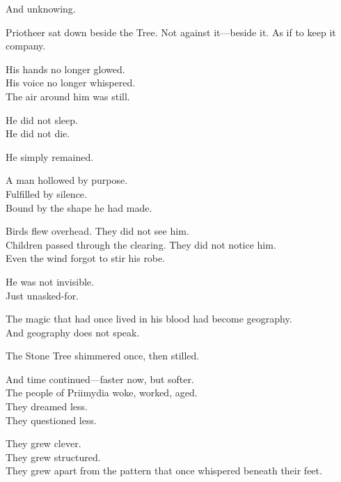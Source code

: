 \documentclass[12pt]{article}
\begin{document}
\vspace{0.5em}
And unknowing.

\vspace{0.5em}
Priotheer sat down beside the Tree. Not against it---beside it. As if to keep it company.

\vspace{0.5em}
His hands no longer glowed.\\
His voice no longer whispered.\\
The air around him was still.

\vspace{0.5em}
He did not sleep.\\
He did not die.

\vspace{0.5em}
He simply remained.

\vspace{0.5em}
A man hollowed by purpose.\\
Fulfilled by silence.\\
Bound by the shape he had made.

\vspace{0.5em}
Birds flew overhead. They did not see him.\\
Children passed through the clearing. They did not notice him.\\
Even the wind forgot to stir his robe.

\vspace{0.5em}
He was not invisible.\\
Just unasked-for.

\vspace{0.5em}
The magic that had once lived in his blood had become geography.\\
And geography does not speak.

\vspace{0.5em}
The Stone Tree shimmered once, then stilled.

\vspace{0.5em}
And time continued---faster now, but softer.\\
The people of Priimydia woke, worked, aged.\\
They dreamed less.\\
They questioned less.

\vspace{0.5em}
They grew clever.\\
They grew structured.\\
They grew apart from the pattern that once whispered beneath their feet.
\end{document}
